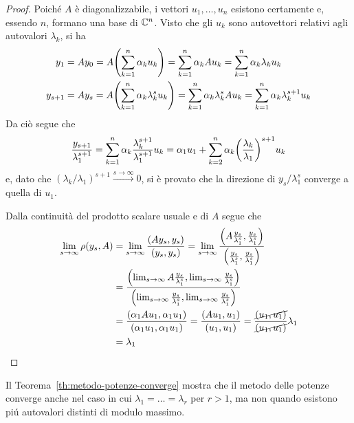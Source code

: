 	\begin{proof}
		Poiché \(A\) è diagonalizzabile, i vettori \(u_1, \dots, u_n\) esistono certamente e, essendo \(n\), formano una base di \(\mathbb{C}^n\). Visto che gli \(u_k\) sono autovettori relativi agli autovalori \(\lambda_k\), si ha
		\begin{align*}
			y_1 &= A y_0 = A \qty(\sum_{k = 1}^n \alpha_k u_k) = \sum_{k = 1}^n \alpha_k A u_k = \sum_{k = 1}^n \alpha_k \lambda_k u_k \\
			y_{s + 1} &= A y_s = A \qty(\sum_{k = 1}^n \alpha_k \lambda_k^s u_k) = \sum_{k = 1}^n \alpha_k \lambda_k^s A u_k = \sum_{k = 1}^n \alpha_k \lambda_k^{s + 1} u_k
		\end{align*}
		Da ciò segue che
		\begin{equation*}
			\frac{y_{s + 1}}{\lambda_1^{s + 1}} = \sum_{k = 1}^n \alpha_k \frac{\lambda_k^{s + 1}}{\lambda_1^{s + 1}} u_k = \alpha_1 u_1 + \sum_{k = 2}^n \alpha_k \qty(\frac{\lambda_k}{\lambda_1})^{s + 1} u_k
		\end{equation*}
		e, dato che \((\lambda_k / \lambda_1)^{s + 1} \xrightarrow{s \to \infty} 0\), si è provato che la direzione di \(y_s / \lambda_1^s\) converge a quella di \(u_1\).
		
		Dalla continuità del prodotto scalare usuale e di \(A\) segue che
		\begin{equation*}
			\begin{split}
				\lim_{s \to \infty} \operatorname{\rho} (y_s, A) &= \lim_{s \to \infty} \frac{(A y_s, y_s)}{(y_s, y_s)} = \lim_{s \to \infty} \frac{\qty(A \frac{y_s}{\lambda_1^s}, \frac{y_s}{\lambda_1^s})}{\qty(\frac{y_s}{\lambda_1^s}, \frac{y_s}{\lambda_1^s})} \\
				&= \frac{\qty(\lim_{s \to \infty} A \frac{y_s}{\lambda_1^s}, \lim_{s \to \infty} \frac{y_s}{\lambda_1^s})}{\qty(\lim_{s \to \infty} \frac{y_s}{\lambda_1^s}, \lim_{s \to \infty} \frac{y_s}{\lambda_1^s})} \\
				&= \frac{\qty(\alpha_1 A u_1, \alpha_1 u_1)}{\qty(\alpha_1 u_1, \alpha_1 u_1)} = \frac{(A u_1, u_1)}{(u_1, u_1)} = \frac{\cancel{(u_1, u_1)}}{\cancel{(u_1, u_1)}} \lambda_1 \\
				&= \lambda_1 \qedhere
			\end{split}
		\end{equation*}
	\end{proof}

	\begin{osservazione}
		Il Teorema~\ref{th:metodo-potenze-converge} mostra che il metodo delle potenze converge anche nel caso in cui \(\lambda_1 = \dots = \lambda_r\) per \(r > 1\), ma non quando esistono piú autovalori distinti di modulo massimo.
	\end{osservazione}

